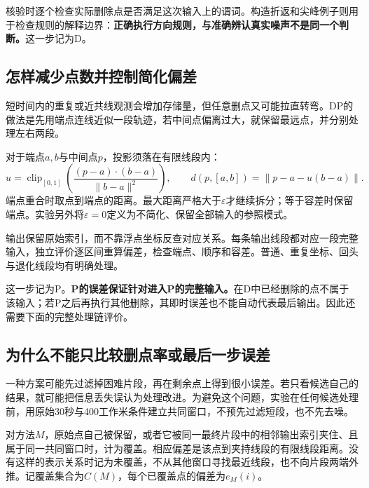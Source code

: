 核验时逐个检查实际删除点是否满足这次输入上的谓词。构造折返和尖峰例子则用于检查规则的解释边界：\textbf{正确执行方向规则，与准确辨认真实噪声不是同一个判断。}这一步记为D。

\subsection{怎样减少点数并控制简化偏差}
短时间内的重复或近共线观测会增加存储量，但任意删点又可能拉直转弯。DP的做法是先用端点连线近似一段轨迹，若中间点偏离过大，就保留最远点，并分别处理左右两段\cite{teacher}。

对于端点$a,b$与中间点$p$，投影须落在有限线段内：
\[
u=\operatorname{clip}_{[0,1]}\!\left(\frac{(p-a)\cdot(b-a)}{\|b-a\|^2}\right),
\qquad d(p,[a,b])=\|p-a-u(b-a)\|.
\]
端点重合时取点到端点的距离。最大距离严格大于$\varepsilon$才继续拆分；等于容差时保留端点。实验另外将$\varepsilon=0$定义为不简化、保留全部输入的参照模式。

输出保留原始索引，而不靠浮点坐标反查对应关系。每条输出线段都对应一段完整输入，独立评价逐区间重算偏差，检查端点、顺序和容差。普通、重复坐标、回头与退化线段均有明确处理。

这一步记为P。\textbf{P的误差保证针对进入P的完整输入。}在D中已经删除的点不属于该输入；若P之后再执行其他删除，其即时误差也不能自动代表最后输出。因此还需要下面的完整处理链评价。

\subsection{为什么不能只比较删点率或最后一步误差}
一种方案可能先过滤掉困难片段，再在剩余点上得到很小误差。若只看候选自己的结果，就可能把信息丢失误认为处理改进。为避免这个问题，实验在任何候选处理前，用原始30秒与400工作米条件建立共同窗口，不预先过滤短段，也不先去噪。

对方法$M$，原始点自己被保留，或者它被同一最终片段中的相邻输出索引夹住、且属于同一共同窗口时，计为覆盖。相应偏差是该点到夹持线段的有限线段距离。没有这样的表示关系时记为未覆盖，不从其他窗口寻找最近线段，也不向片段两端外推。记覆盖集合为$C(M)$，每个已覆盖点的偏差为$e_M(i)$。

